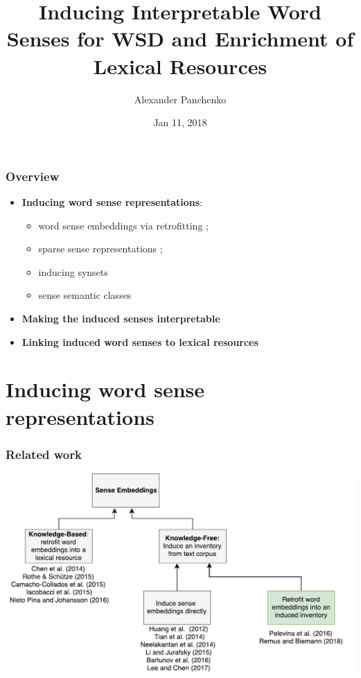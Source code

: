 \documentclass{beamer}
\title{Inducing Interpretable Word Senses for WSD and Enrichment of Lexical Resources}
\author{Alexander Panchenko} %
\date[11.02.2018]{Jan 11, 2018}
\begin{document}
\maketitle

\begin{frame}
  \frametitle{Overview}

  \begin{itemize}
		\item \textbf{Inducing word sense representations}:
		\begin{itemize}
		\item word sense embeddings via retrofitting \cite{pelevina-EtAl:2016:RepL4NLP,remus:2018};
		\item sparse sense representations \cite{panchenko-EtAl:2017:EACLlong};
		\item inducing synsets~\cite{ustalov-panchenko-biemann:2017:Long}
		\item sense semantic classes \cite{panchenko:2018:SemanticClasses} 
		\end{itemize}
		
	\pause 
	\vspace{1em}
	\item \textbf{Making the induced senses interpretable} \cite{panchenko-EtAl:2017:EMNLP2017Demos,panchenko-EtAl:2017:EACLlong}
	
	\pause
	\vspace{1em}
	\item \textbf{Linking induced word senses to lexical resources}~\cite{faralli2016linked,panchenko-EtAl:2017:SENSE2017,biemann2018framework}	
			
\end{itemize}
	
\end{frame}

\section{Inducing word sense representations}


\begin{frame}[fragile]
\frametitle{Related work}
\begin{center}
 \includegraphics[height=0.56\textwidth]{sense_embeddings}
 \end{center}
\end{frame}
\end{document}
